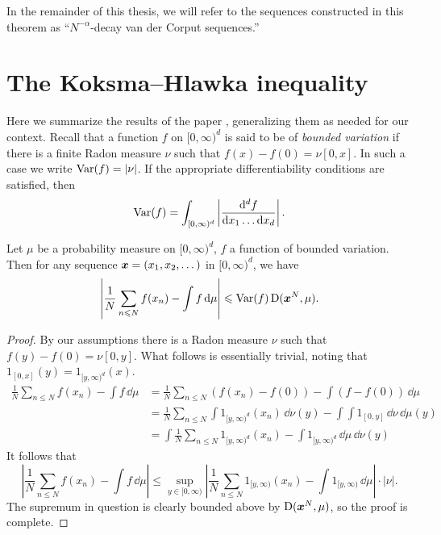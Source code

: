In the remainder of this thesis, we will refer to the sequences constructed in 
this theorem as ``$N^{-\alpha}$-decay van der Corput sequences.''





\section{The Koksma--Hlawka inequality}

Here we summarize the results of the paper \cite{okten-1999}, generalizing them 
as needed for our context. Recall that a function $f$ on $[0,\infty)^d$ is 
said to be of \emph{bounded variation} if there is a finite Radon measure $\nu$ 
such that $f(x) - f(0) = \nu[0,x]$. In such a case we write 
$\operatorname{Var}(f) = |\nu|$. If the appropriate differentiability conditions are 
satisfied, then 
\[
	\operatorname{Var}(f) = \int_{[0,\infty)^d} \left|\frac{\mathrm{d}^d f}{\mathrm{d} x_1 \dots \mathrm{d} x_d} \right|.
\]

\begin{theorem}
Let $\mu$ be a probability measure on $[0,\infty)^d$, $f$ a function of 
bounded variation. Then for any sequence ${\boldsymbol x} = (x_1,x_2,\dots)$ in 
$[0,\infty)^d$, we have 
\[
	\left| \frac{1}{N} \sum_{n\leqslant N} f(x_n) - \int f\, \mathrm{d}\mu \right| \leqslant \operatorname{Var}(f) \operatorname{D}({\boldsymbol x}^N,\mu) .
\]
\end{theorem}
\begin{proof}
By our assumptions there is a Radon measure $\nu$ such that 
$f(y) - f(0) = \nu[0,y]$. What follows is essentially trivial, noting that 
$1_{[0,x]}(y) = 1_{[y,\infty)^d}(x)$. 
\begin{align*}
	\frac{1}{N} \sum_{n\leqslant N} f(x_n) - \int f\, \dd\mu 
		&= \frac{1}{N} \sum_{n\leqslant N} \left(f(x_n) - f(0)\right) - \int \left(f - f(0)\right)\, \dd\mu \\
		&= \frac{1}{N} \sum_{n\leqslant N} \int 1_{[y,\infty)^d}(x_n)\, \dd \nu(y) - \int \int 1_{[0,y]}\, \dd\nu \, \dd\mu(y) \\
		&= \int \frac{1}{N} \sum_{n\leqslant N} 1_{[y,\infty)^d}(x_n) - \int 1_{[y,\infty)^d}\, \dd\mu \, \dd\nu(y)
\end{align*}
It follows that 
\[
	\left| \frac{1}{N} \sum_{n\leqslant N} f(x_n) - \int f\, \dd\mu \right|
		\leqslant \sup_{y\in [0,\infty)} \left| \frac{1}{N} \sum_{n\leqslant N} 1_{[y,\infty)}(x_n) - \int 1_{[y,\infty)}\, \dd\mu\right| \cdot |\nu| .
\]
The supremum in question is clearly bounded above by $\operatorname{D}({\boldsymbol x}^N,\mu)$, so the 
proof is complete. 
\end{proof}

